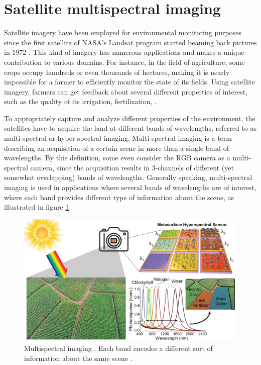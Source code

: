 \section{Satellite multispectral imaging}
Satellite imagery have been employed for environmental monitoring purposes since the first satellite of NASA’s Landsat program started beaming back pictures in 1972 \cite{wang2007impact, williams2006landsat, 3320}.
This kind of imagery has numerous applications and makes a unique contribution to various domains.
For instance, in the field of agriculture, some crops occupy hundreds or even thousands of hectares, making it is nearly impossible for a farmer to efficiently monitor the state of its fields. Using satellite imagery, farmers can get feedback about several different properties of interest, such as the quality of its irrigation, fertilization, \etc \cite{agronomy10050641}.

To appropriately capture and analyze different properties of the environment, the satellites have to acquire the land at different bands of wavelengths, referred to as multi-spectral or hyper-spectral imaging.
Multi-spectral imaging is a term describing an acquisition of a certain scene in more than a single band of wavelengths\cite{sun2010hyperspectral}.
By this definition, some even consider the RGB camera as a multi-spectral camera, since the acquisition results in 3-channels of different (yet somewhat overlapping) bands of wavelengths. 
Generally speaking, multi-spectral imaging is used in applications where several bands of wavelengths are of interest, where each band provides different type of information about the scene, as illustrated in figure \ref{fig:multispectral}. 

\begin{figure}[H]
    \centering
    \includegraphics[width=\linewidth]{../figs/introduction/multispectral.png}    
    \caption{Multispectral imaging . Each band encodes a different sort of information about the same scene \cite{stewart2020ultrafast}.}
    \label{fig:multispectral}
\end{figure}

